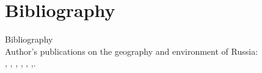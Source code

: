 \documentclass[pdflatex,compress,8pt,
	xcolor={dvipsnames,dvipsnames,svgnames,x11names,table},
	hyperref={colorlinks = true,breaklinks = true, urlcolor = NavyBlue, breaklinks = true}]{beamer}
\begin{document}
\section{Bibliography}
\Large{Bibliography}\\
\normalsize{Author's publications on the geography and environment of Russia:}\\

\cite{Lemenkova2004a}, \cite{Lemenkova2005a}, \cite{Lemenkova2005b1}, \cite{Lemenkova2012d}, \cite{Lemenkova2012f}, \cite{Lemenkova2012c},\cite{Lemenkova2002b}.

\printbibliography[heading=none]
	
\end{document}
